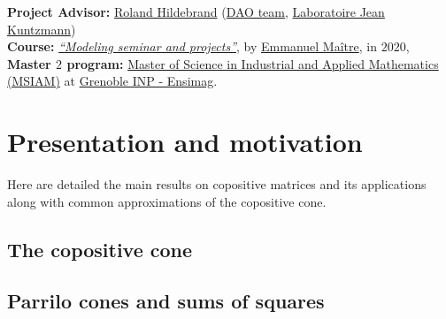 \documentclass[onecolumn,11pt,a4paper]{article}
\theoremstyle{plain}  %
\theoremstyle{remark}  %
\newcommand{\blankpage}{}
\begin{document}
\vfill{}
\begin{center}
    \begin{large}
        \textbf{Project Advisor:} \href{http://www-ljk.imag.fr/membres/Roland.Hildebrand/}{Roland Hildebrand} (\href{http://dao-ljk.imag.fr/}{DAO team}, \href{http://www-ljk.imag.fr/}{Laboratoire Jean Kuntzmann}) \\
        \textbf{Course:}
        \emph{\href{https://chamilo.grenoble-inp.fr/courses/ENSIMAGWMM9AM10/index.php}{``Modeling seminar and projects''}}, by \href{http://www-ljk.imag.fr/membres/Emmanuel.Maitre/doku.php}{Emmanuel Maître}, in $2020$, \\
        \textbf{Master $2$ program: } \href{https://msiam.imag.fr/doku.php}{Master of Science in Industrial and Applied Mathematics (MSIAM)}
        at \href{https://ensimag.grenoble-inp.fr/}{Grenoble INP - Ensimag}. \\
    \end{large}
\end{center}
\newpage

\blankpage

\section{Presentation and motivation}
\label{sec:presentation}
Here are detailed the main results on copositive matrices and its applications along with common approximations of the copositive cone.
\subsection{The copositive cone}
\label{sub:copositive}
\subsection{Parrilo cones and sums of squares}
\label{sub:parrilo}
\end{document}
